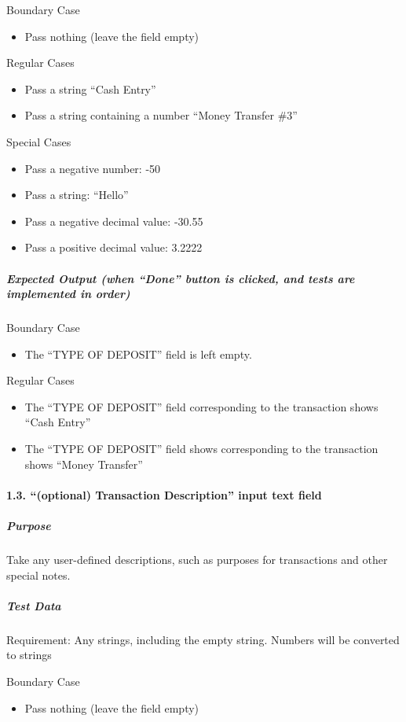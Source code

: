 \documentclass[12pt]{article}
\begin{document}
Boundary Case
\begin{itemize}
  \item Pass nothing (leave the field empty)
\end{itemize}

Regular Cases
\begin{itemize}
  \item Pass a string  ``Cash Entry''
  \item Pass a string containing a number  ``Money Transfer \#3''
\end{itemize}

Special Cases
\begin{itemize}
  \item Pass a negative number: -50
  \item Pass a string: ``Hello''
  \item Pass a negative decimal value: -30.55
  \item Pass a positive decimal value: 3.2222
\end{itemize}

\subparagraph{Expected Output (when ``Done'' button is clicked, and tests are implemented in order)}

Boundary Case
\begin{itemize}
  \item The ``TYPE OF DEPOSIT'' field is left empty.
\end{itemize}

Regular Cases
\begin{itemize}
  \item The ``TYPE OF DEPOSIT'' field corresponding to the transaction shows ``Cash Entry''
  \item The ``TYPE OF DEPOSIT'' field shows corresponding to the transaction shows ``Money Transfer''
\end{itemize}

\paragraph{1.3. ``(optional) Transaction Description'' input text field}
 
\subparagraph{Purpose} Take any user-defined descriptions, such as purposes for transactions and other special notes.
 
\subparagraph{Test Data} Requirement: Any strings, including the empty string. Numbers will be converted to strings
 
Boundary Case
\begin{itemize}
  \item Pass nothing (leave the field empty)
  \end{itemize}
\end{document}
